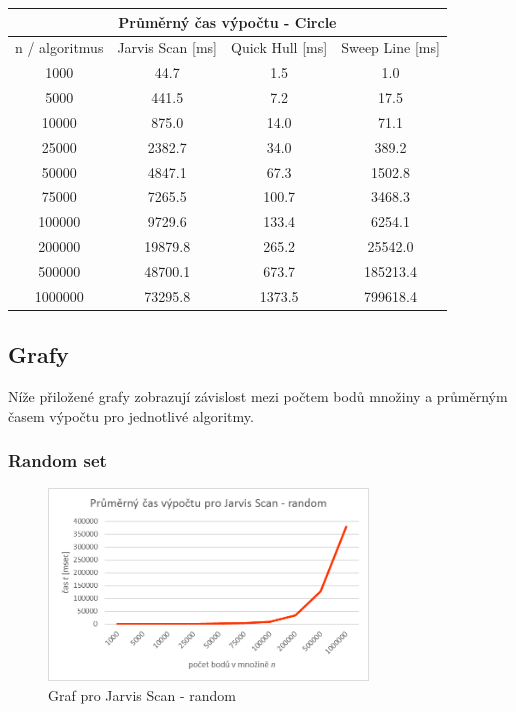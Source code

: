 \documentclass[a4paper, 12pt]{article}
\begin{document}
\begin{table}[]
\centering
\begin{tabular}{|c|c|c|c|}
\hline
\multicolumn{4}{|c|}{\textbf{Průměrný čas výpočtu - Circle}}                	  \\ \hline
n / algoritmus & Jarvis Scan {[}ms{]} & Quick Hull {[}ms{]} & Sweep Line {[}ms{]} \\ \hline
1000           & 44.7                 & 1.5                 & 1.0                 \\ \hline
5000           & 441.5                & 7.2                 & 17.5                \\ \hline
10000          & 875.0                & 14.0                & 71.1                \\ \hline
25000          & 2382.7               & 34.0                & 389.2               \\ \hline
50000          & 4847.1               & 67.3                & 1502.8              \\ \hline
75000          & 7265.5               & 100.7               & 3468.3              \\ \hline
100000         & 9729.6               & 133.4               & 6254.1              \\ \hline
200000         & 19879.8              & 265.2               & 25542.0             \\ \hline
500000         & 48700.1              & 673.7               & 185213.4            \\ \hline
1000000        & 73295.8              & 1373.5              & 799618.4            \\ \hline
\end{tabular}
\end{table}

\clearpage

\subsection{Grafy}
Níže přiložené grafy zobrazují závislost mezi počtem bodů množiny a průměrným časem výpočtu pro jednotlivé algoritmy. 

\subsubsection{Random set}
\begin{figure}[h!]
	\centering
	\includegraphics[width=8.5cm]{./pictures/g_rand_js.png}
	\caption{Graf pro Jarvis Scan - random}
\end{figure}
\end{document}
